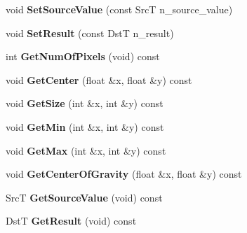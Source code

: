 \begin{DoxyCompactItemize}
\item 
\hypertarget{class_labeling_1_1_region_info_a0201a75e76be943592bca8cd356043fb}{}\label{class_labeling_1_1_region_info_a0201a75e76be943592bca8cd356043fb} 
void {\bfseries Set\+Source\+Value} (const SrcT n\+\_\+source\+\_\+value)
\item 
\hypertarget{class_labeling_1_1_region_info_ac97c903d9e3eb9f77be6ccf9ccdbf2c0}{}\label{class_labeling_1_1_region_info_ac97c903d9e3eb9f77be6ccf9ccdbf2c0} 
void {\bfseries Set\+Result} (const DstT n\+\_\+result)
\item 
\hypertarget{class_labeling_1_1_region_info_ae9014e00d562affb3db5c52729db22ce}{}\label{class_labeling_1_1_region_info_ae9014e00d562affb3db5c52729db22ce} 
int {\bfseries Get\+Num\+Of\+Pixels} (void) const
\item 
\hypertarget{class_labeling_1_1_region_info_a2eea6ea04e7b40dfcefd1605040a018c}{}\label{class_labeling_1_1_region_info_a2eea6ea04e7b40dfcefd1605040a018c} 
void {\bfseries Get\+Center} (float \&x, float \&y) const
\item 
\hypertarget{class_labeling_1_1_region_info_adc840bde00b274ce0cedb98083b87df8}{}\label{class_labeling_1_1_region_info_adc840bde00b274ce0cedb98083b87df8} 
void {\bfseries Get\+Size} (int \&x, int \&y) const
\item 
\hypertarget{class_labeling_1_1_region_info_afb5900bfcbd2e4dc40d893c26cd62255}{}\label{class_labeling_1_1_region_info_afb5900bfcbd2e4dc40d893c26cd62255} 
void {\bfseries Get\+Min} (int \&x, int \&y) const
\item 
\hypertarget{class_labeling_1_1_region_info_ac0b0f50f35f5f4477e39bf119ea8716d}{}\label{class_labeling_1_1_region_info_ac0b0f50f35f5f4477e39bf119ea8716d} 
void {\bfseries Get\+Max} (int \&x, int \&y) const
\item 
\hypertarget{class_labeling_1_1_region_info_ab09260d5fb64457dcdcbdc2d34ca486c}{}\label{class_labeling_1_1_region_info_ab09260d5fb64457dcdcbdc2d34ca486c} 
void {\bfseries Get\+Center\+Of\+Gravity} (float \&x, float \&y) const
\item 
\hypertarget{class_labeling_1_1_region_info_a4279075549a1af1df8660fe3b5c4fae5}{}\label{class_labeling_1_1_region_info_a4279075549a1af1df8660fe3b5c4fae5} 
SrcT {\bfseries Get\+Source\+Value} (void) const
\item 
\hypertarget{class_labeling_1_1_region_info_adca2a69f45b33dd2f3f67a17ca17a07b}{}\label{class_labeling_1_1_region_info_adca2a69f45b33dd2f3f67a17ca17a07b} 
DstT {\bfseries Get\+Result} (void) const
\item 

\end{DoxyCompactItemize}
